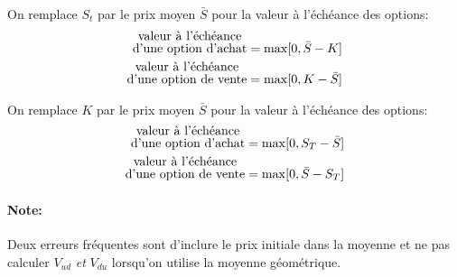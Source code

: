 \documentclass[10pt, french]{article}
\begin{document}
\begin{multicols*}{2}
\begin{definitionNOHFILLsub}
On remplace $S_{t}$ par le prix moyen $\bar{S}$ pour la valeur à l'échéance des options:
\begin{align*}
	\shortstack{valeur à l'échéance\\ d'une option d'achat}
	&=	\max[0, \bar{S}	-	K]	\\
	\shortstack{valeur à l'échéance\\ d'une option de vente}
	&=	\max[0, 	K	-	\bar{S}]
\end{align*}
\end{definitionNOHFILLsub}

\begin{definitionNOHFILLsub}
On remplace $K$ par le prix moyen $\bar{S}$ pour la valeur à l'échéance des options:
\begin{align*}
	\shortstack{valeur à l'échéance\\ d'une option d'achat}
	&=	\max[0, S_{T}	-	\bar{S}]	\\
	\shortstack{valeur à l'échéance\\ d'une option de vente}
	&=	\max[0, 	\bar{S}	-	S_{T}]
\end{align*}
\end{definitionNOHFILLsub}

\paragraph{Note:}	Deux erreurs fréquentes sont d'inclure le prix initiale dans la moyenne et ne pas calculer $V_{ud}$ \textit{et} $V_{du}$ lorsqu'on utilise la moyenne géométrique.


\end{multicols*}
\end{document}
